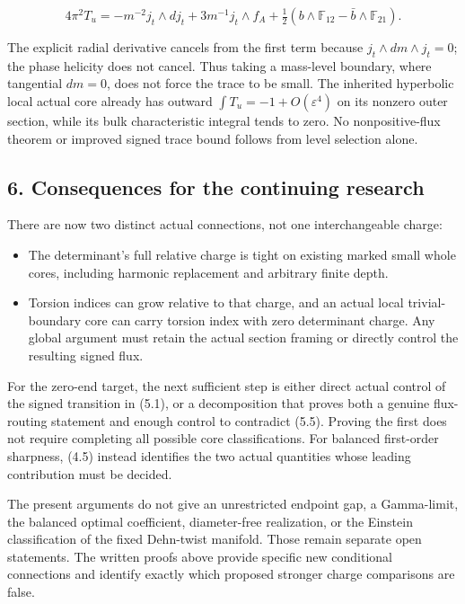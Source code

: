 \documentclass[
  10pt,
]{article}
\providecommand{\tightlist}{%
  \setlength{\itemsep}{0pt}\setlength{\parskip}{0pt}}
\begin{document}
\[
 4\pi^2T_u=-m^{-2}j_t\wedge dj_t+3m^{-1}j_t\wedge f_A
          +\tfrac12(b\wedge\mathbb F_{12}-\bar b\wedge\mathbb F_{21}).
 \tag{5.9}
\]

The explicit radial derivative cancels from the first term because
\(j_t\wedge dm\wedge j_t=0\); the phase helicity does not cancel. Thus
taking a mass-level boundary, where tangential \(dm=0\), does not force
the trace to be small. The inherited hyperbolic local actual core
already has outward \(\int T_u=-1+O(\varepsilon^4)\) on its nonzero
outer section, while its bulk characteristic integral tends to zero. No
nonpositive-flux theorem or improved signed trace bound follows from
level selection alone.

\hypertarget{consequences-for-the-continuing-research}{%
\subsection{6. Consequences for the continuing
research}\label{consequences-for-the-continuing-research}}

There are now two distinct actual connections, not one interchangeable
charge:

\begin{itemize}
\tightlist
\item
  The determinant's full relative charge is tight on existing marked
  small whole cores, including harmonic replacement and arbitrary finite
  depth.
\item
  Torsion indices can grow relative to that charge, and an actual local
  trivial-boundary core can carry torsion index with zero determinant
  charge. Any global argument must retain the actual section framing or
  directly control the resulting signed flux.
\end{itemize}

For the zero-end target, the next sufficient step is either direct
actual control of the signed transition in (5.1), or a decomposition
that proves both a genuine flux-routing statement and enough control to
contradict (5.5). Proving the first does not require completing all
possible core classifications. For balanced first-order sharpness, (4.5)
instead identifies the two actual quantities whose leading contribution
must be decided.

The present arguments do not give an unrestricted endpoint gap, a
Gamma-limit, the balanced optimal coefficient, diameter-free
realization, or the Einstein classification of the fixed Dehn-twist
manifold. Those remain separate open statements. The written proofs
above provide specific new conditional connections and identify exactly
which proposed stronger charge comparisons are false.
\end{document}
